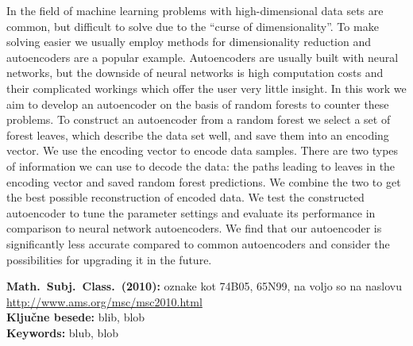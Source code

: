 \documentclass[12pt,a4paper,twoside]{article}
\newcommand{\kljucnebesede}{blib\sep blob} %
\newcommand{\keywords}{blub\sep blob} %
\newcommand{\sep}{, }  %
\theoremstyle{definition} %
\theoremstyle{plain} %
\numberwithin{equation}{section}  %
\begin{document}
In the field of machine learning problems with high-dimensional data sets are common, but difficult to solve due to the ``curse of dimensionality''.
To make solving easier we usually employ methods for dimensionality reduction and autoencoders are a popular example.
Autoencoders are usually built with neural networks, but the downside of neural networks is high computation costs and their complicated workings which offer the user very little insight.
In this work we aim to develop an autoencoder on the basis of random forests to counter these problems.
%
To construct an autoencoder from a random forest we select a set of forest leaves, which describe the data set well, and save them into an encoding vector.
We use the encoding vector to encode data samples.
There are two types of information we can use to decode the data: the paths leading to leaves in the encoding vector and saved random forest predictions.
We combine the two to get the best possible reconstruction of encoded data.
%
We test the constructed autoencoder to tune the parameter settings and evaluate its performance in comparison to neural network autoencoders.
We find that our autoencoder is significantly less accurate compared to common autoencoders and consider the possibilities for upgrading it in the future.

\vfill\noindent
\textbf{Math.~Subj.~Class.~(2010):} oznake kot 74B05, 65N99, na voljo so na naslovu
\url{http://www.ams.org/msc/msc2010.html} \\[1mm]
\textbf{Ključne besede:} \kljucnebesede \\[1mm]
\textbf{Keywords:} \keywords

\cleardoublepage

\setcounter{page}{1}    %



\end{document}
